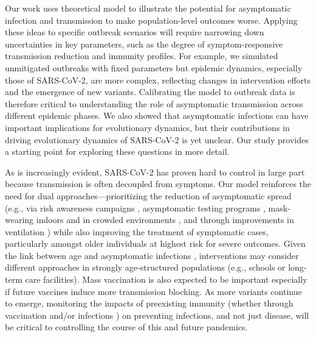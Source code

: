 \documentclass[12pt]{article}
\begin{document}
Our work uses theoretical model to illustrate the potential for asymptomatic infection and transmission to make population-level outcomes worse.
Applying these ideas to specific outbreak scenarios will require narrowing down uncertainties in key parameters, such as the degree of symptom-responsive transmission reduction and immunity profiles.
For example, we simulated unmitigated outbreaks with fixed parameters but epidemic dynamics, especially those of SARS-CoV-2, are more complex, reflecting changes in intervention efforts and the emergence of new variants.
Calibrating the model to outbreak data is therefore critical to understanding the role of asymptomatic transmission across different epidemic phases.
We also showed that asymptomatic infections can have important implications for evolutionary dynamics, but their contributions in driving evolutionary dynamics of SARS-CoV-2 is yet unclear.
Our study provides a starting point for exploring these questions in more detail.

As is increasingly evident, SARS-CoV-2 has proven hard to control in large part because transmission is often decoupled from symptoms. 
Our model reinforces the need for dual approaches---prioritizing the reduction of asymptomatic spread (e.g., via risk awareness campaigns \cite{Bavel2020,chande2020real,sinclair2021pairing}, asymptomatic testing programs \cite{mina2021covid,gibson2022surv,Ranoa2022}, mask-wearing indoors and in crowded environments \cite{jones2020two,prather2020reducing,howard2021ev}, and through improvements in ventilation \cite{allen2021indoor,wang2021airborne}) while also improving the treatment of symptomatic cases, particularly amongst older individuals at highest risk for severe outcomes.
Given the link between age and asymptomatic infections \cite{davies2020}, interventions may consider different approaches in strongly age-structured populations (e.g., schools or long-term care facilities).
Mass vaccination is also expected to be important especially if future vaccines induce more transmission blocking.
As more variants continue to emerge, monitoring the impacts of preexisting immunity (whether through vaccination and/or infections  \cite{lopman2021framework}) on preventing infections, and not just disease, will be critical to controlling the course of this and future pandemics.
\end{document}
